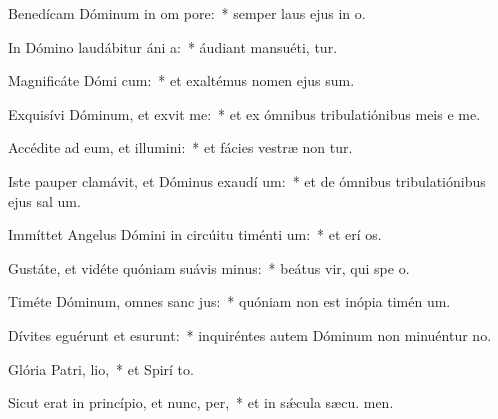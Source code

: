 \item Benedícam Dóminum in om pore:~* semper laus ejus in  o.
\item In Dómino laudábitur áni a:~* áudiant mansuéti,  tur.
\item Magnificáte Dómi cum:~* et exaltémus nomen ejus  sum.
\item Exquisívi Dóminum, et exvit me:~* et ex ómnibus tribulatiónibus meis e me.
\item Accédite ad eum, et illumini:~* et fácies vestræ non tur.
\item Iste pauper clamávit, et Dóminus exaudí um:~* et de ómnibus tribulatiónibus ejus sal um.
\item Immíttet Angelus Dómini in circúitu timénti um:~* et erí os.
\item Gustáte, et vidéte quóniam suávis  minus:~* beátus vir, qui spe  o.
\item Timéte Dóminum, omnes sanc jus:~* quóniam non est inópia timén um.
\item Dívites eguérunt et esurunt:~* inquiréntes autem Dóminum non minuéntur  no.
\item Glória Patri,  lio,~* et Spirí to.
\item Sicut erat in princípio, et nunc,  per,~* et in sǽcula sæcu. men.
